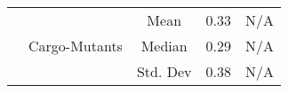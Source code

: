 \documentclass[sigconf,review, anonymous]{acmart}
\begin{document}
{\begin{table}[htbp]
{\begin{tabular}{|c|c|c|c|c|c|}
 & \multirow{3}{*}{Cargo-Mutants} & \multicolumn{2}{c|}{Mean} & 0.33 & N/A\\\cline{3-6}
    &   &  \multicolumn{2}{c|}{Median} & 0.29 & N/A \\\cline{3-6}
    &   &  \multicolumn{2}{c|}{Std. Dev} & 0.38 & N/A \\ \hline
    
    
\end{tabular}
}
\end{table}


\begin{table}[htbp]
\centering
\caption{Java (UniversalMutator vs. PIT vs. LittleDarwin)}
\label{tab:table_java2}
\end{table}}
\end{document}
